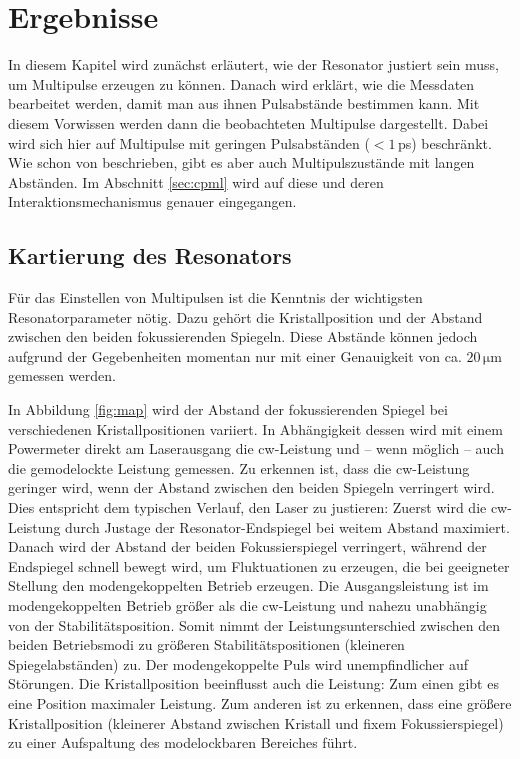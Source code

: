 \documentclass[bachelor,       %
               twoside,        %
               BCOR10mm,       %
               liststotoc,nomtotoc,bibtotoc, %
               english,ngerman, %
               final,          %
               ]{GAUBM}
\begin{document}
\chapter{Ergebnisse}
In diesem Kapitel wird zunächst erläutert, wie der Resonator justiert sein muss, um Multipulse erzeugen zu können.
Danach wird erklärt, wie die Messdaten bearbeitet werden, damit man aus ihnen Pulsabstände bestimmen kann.
Mit diesem Vorwissen werden dann die beobachteten Multipulse dargestellt.
Dabei wird sich hier auf Multipulse mit geringen Pulsabständen ($< 1\,$ps) beschränkt.
Wie schon von \cite{lai_multiple_1997} beschrieben, gibt es aber auch Multipulszustände mit langen Abständen.
Im Abschnitt \ref{sec:cpml} wird auf diese und deren Interaktionsmechanismus genauer eingegangen.

\section{Kartierung des Resonators}
Für das Einstellen von Multipulsen ist die Kenntnis der wichtigsten Resonatorparameter nötig.
Dazu gehört die Kristallposition und der Abstand zwischen den beiden fokussierenden Spiegeln.
Diese Abstände können jedoch aufgrund der Gegebenheiten momentan nur mit einer Genauigkeit von ca. $20\,\si{\micro\meter}$ gemessen werden.

In Abbildung \ref{fig:map} wird der Abstand der fokussierenden Spiegel bei verschiedenen Kristallpositionen variiert.
In Abhängigkeit dessen wird mit einem Powermeter direkt am Laserausgang die cw-Leistung und -- wenn möglich -- auch die gemodelockte Leistung gemessen.
Zu erkennen ist, dass die cw-Leistung geringer wird, wenn der Abstand zwischen den beiden Spiegeln verringert wird.
Dies entspricht dem typischen Verlauf, den Laser zu justieren:
Zuerst wird die cw-Leistung durch Justage der Resonator-Endspiegel bei weitem Abstand maximiert.
Danach wird der Abstand der beiden Fokussierspiegel verringert, während der Endspiegel schnell bewegt wird, um Fluktuationen zu erzeugen, die bei geeigneter Stellung den modengekoppelten Betrieb erzeugen.
Die Ausgangsleistung ist im modengekoppelten Betrieb größer als die cw-Leistung und nahezu unabhängig von der Stabilitätsposition.
Somit nimmt der Leistungsunterschied zwischen den beiden Betriebsmodi zu größeren Stabilitätspositionen (kleineren Spiegelabständen) zu.
Der modengekoppelte Puls wird unempfindlicher auf Störungen.
Die Kristallposition beeinflusst auch die Leistung: Zum einen gibt es eine Position maximaler Leistung.
Zum anderen ist zu erkennen, dass eine größere Kristallposition (kleinerer Abstand zwischen Kristall und fixem Fokussierspiegel) zu einer Aufspaltung des modelockbaren Bereiches führt.
\end{document}
